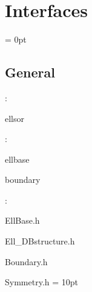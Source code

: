 
\section{Interfaces} 


\parskip = 0pt

\vspace{3mm} \subsection*{General}

: 

ellsor
\vspace{2mm}

: 

ellbase

boundary
\vspace{2mm}

\vspace{5mm}

: 

EllBase.h

Ell\_DBstructure.h

Boundary.h

Symmetry.h
\vspace{2mm}\parskip = 10pt 
